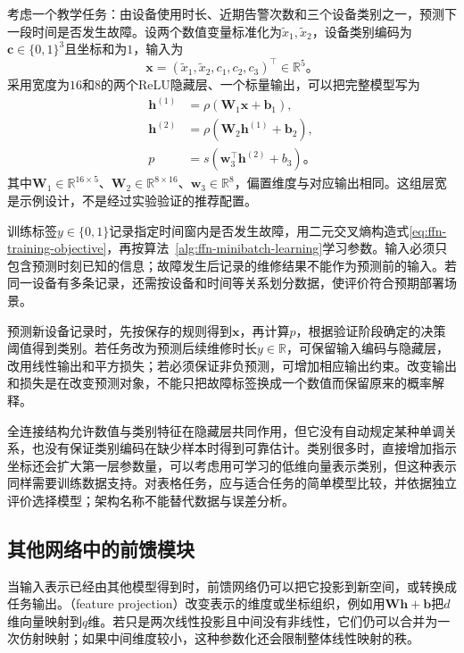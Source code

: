 考虑一个教学任务：由设备使用时长、近期告警次数和三个设备类别之一，预测下一段时间是否发生故障。设两个数值变量标准化为$\widetilde x_1,\widetilde x_2$，设备类别编码为$\bm{c}\in\{0,1\}^{3}$且坐标和为$1$，输入为
\[
  \bm{x}=(\widetilde x_1,\widetilde x_2,c_1,c_2,c_3)^{\top}
  \in\mathbb{R}^{5}\text{。}
\]
采用宽度为$16$和$8$的两个ReLU隐藏层、一个标量输出，可以把完整模型写为
\begin{equation}
  \begin{aligned}
    \bm{h}^{(1)}&=\rho(\bm{W}_1\bm{x}+\bm{b}_1),\\
    \bm{h}^{(2)}&=\rho(\bm{W}_2\bm{h}^{(1)}+\bm{b}_2),\\
    p&=s(\bm{w}_3^{\top}\bm{h}^{(2)}+b_3)\text{。}
  \end{aligned}
  \label{eq:ffn-tabular-classifier}
\end{equation}
其中$\bm{W}_1\in\mathbb{R}^{16\times5}$、$\bm{W}_2\in\mathbb{R}^{8\times16}$、$\bm{w}_3\in\mathbb{R}^{8}$，偏置维度与对应输出相同。这组层宽是示例设计，不是经过实验验证的推荐配置。

训练标签$y\in\{0,1\}$记录指定时间窗内是否发生故障，用二元交叉熵构造式\eqref{eq:ffn-training-objective}，再按算法~\ref{alg:ffn-minibatch-learning}学习参数。输入必须只包含预测时刻已知的信息；故障发生后记录的维修结果不能作为预测前的输入。若同一设备有多条记录，还需按设备和时间等关系划分数据，使评价符合预期部署场景。

预测新设备记录时，先按保存的规则得到$\bm{x}$，再计算$p$，根据验证阶段确定的决策阈值得到类别。若任务改为预测后续维修时长$y\in\mathbb{R}$，可保留输入编码与隐藏层，改用线性输出和平方损失；若必须保证非负预测，可增加相应输出约束。改变输出和损失是在改变预测对象，不能只把故障标签换成一个数值而保留原来的概率解释。

全连接结构允许数值与类别特征在隐藏层共同作用，但它没有自动规定某种单调关系，也没有保证类别编码在缺少样本时得到可靠估计。类别很多时，直接增加指示坐标还会扩大第一层参数量，可以考虑用可学习的低维向量表示类别，但这种表示同样需要训练数据支持。对表格任务，应与适合任务的简单模型比较，并依据独立评价选择模型；架构名称不能替代数据与误差分析。

\subsection{其他网络中的前馈模块}
\label{sec:ffn-modules}

当输入表示已经由其他模型得到时，前馈网络仍可以把它投影到新空间，或转换成任务输出。（feature projection）改变表示的维度或坐标组织，例如用$\bm{W}\bm{h}+\bm{b}$把$d$维向量映射到$q$维。若只是两次线性投影且中间没有非线性，它们仍可以合并为一次仿射映射；如果中间维度较小，这种参数化还会限制整体线性映射的秩。

